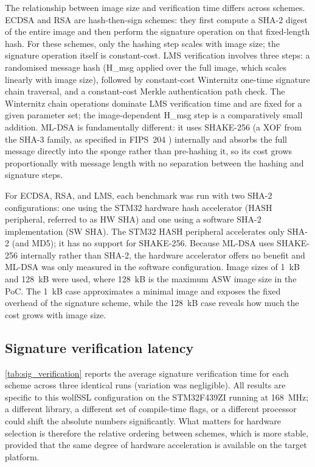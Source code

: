 The relationship between image size and verification time differs across schemes. ECDSA and RSA are hash-then-sign schemes: they first compute a SHA-2 digest of the entire image and then perform the signature operation on that fixed-length hash. For these schemes, only the hashing step scales with image size; the signature operation itself is constant-cost. LMS verification involves three steps: a randomised message hash (H\_msg applied over the full image, which scales linearly with image size), followed by constant-cost Winternitz one-time signature chain traversal, and a constant-cost Merkle authentication path check. The Winternitz chain operations dominate LMS verification time and are fixed for a given parameter set; the image-dependent H\_msg step is a comparatively small addition. ML-DSA is fundamentally different: it uses SHAKE-256 (a XOF from the SHA-3 family, as specified in FIPS~204 \cite{nist_ml_dsa}) internally and absorbs the full message directly into the sponge rather than pre-hashing it, so its cost grows proportionally with message length with no separation between the hashing and signature steps.

For ECDSA, RSA, and LMS, each benchmark was run with two SHA-2 configurations: one using the STM32 hardware hash accelerator (HASH peripheral, referred to as HW SHA) and one using a software SHA-2 implementation (SW SHA). The STM32 HASH peripheral accelerates only SHA-2 (and MD5); it has no support for SHAKE-256. Because ML-DSA uses SHAKE-256 internally rather than SHA-2, the hardware accelerator offers no benefit and ML-DSA was only measured in the software configuration. Image sizes of 1~kB and 128~kB were used, where 128~kB is the maximum ASW image size in the PoC. The 1~kB case approximates a minimal image and exposes the fixed overhead of the signature scheme, while the 128~kB case reveals how much the cost grows with image size.

\subsection{Signature verification latency}
\label{subsection:eval-benchmarks-latency}

\autoref{tab:sig_verification} reports the average signature verification time for each scheme across three identical runs (variation was negligible). All results are specific to this wolfSSL configuration on the STM32F439ZI running at 168~MHz; a different library, a different set of compile-time flags, or a different processor could shift the absolute numbers significantly. What matters for hardware selection is therefore the relative ordering between schemes, which is more stable, provided that the same degree of hardware acceleration is available on the target platform.

